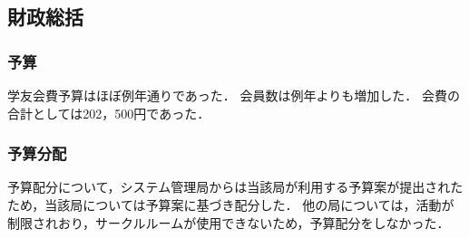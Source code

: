 \subsection*{財政総括}


\subsubsection*{予算}
学友会費予算はほぼ例年通りであった．
会員数は例年よりも増加した． 
会費の合計としては202，500円であった．

\subsubsection*{予算分配}
予算配分について，システム管理局からは当該局が利用する予算案が提出されたため，当該局については予算案に基づき配分した．
他の局については，活動が制限されおり，サークルルームが使用できないため，予算配分をしなかった．
